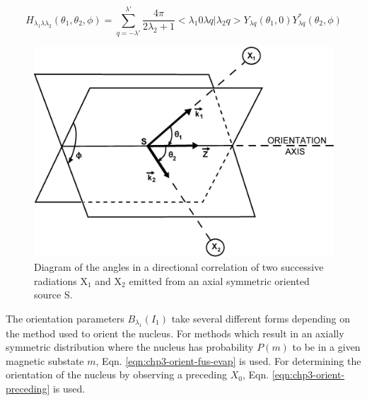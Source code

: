 \begin{equation}
\label{eqn:chp3-angular-function}
H_{\lambda{}_1\lambda{}\lambda{}_2}\left(\theta{}_1,\theta{}_2,\phi{}\right) = \sum\limits_{q=-\lambda{}'}^{\lambda{}'}\frac{4 \pi{}}{2\lambda{}_2 +1} <\lambda{}_1 0 \lambda{} q | \lambda{}_2 q> Y_{\lambda{}q}\left(\theta{}_1,0\right) Y^{*}_{\lambda{}q}\left(\theta{}_2,\phi{}\right)
\end{equation}

\begin{figure}[h!]
	\centerline{\includegraphics[height=0.35\textheight]{./img/c3/dco_setup.eps}}
	\caption{Diagram of the angles in a directional correlation of two successive radiations X$_{1}$ and X$_{2}$ emitted from an axial symmetric oriented source S.}
	\label{fig:chp3-DCO-Angles}
\end{figure}

The orientation parameters $B_{\lambda{}_1}\left(I_1\right)$ take several different forms depending on the method used to orient the nucleus. For methods which result in an axially symmetric distribution where the nucleus has probability $P(m)$ to be in a given magnetic substate $m$, Eqn. \ref{eqn:chp3-orient-fus-evap} is used. For determining the orientation of the nucleus by observing a preceding \gr{} $X_0$, Eqn. \ref{eqn:chp3-orient-preceding} is used.

